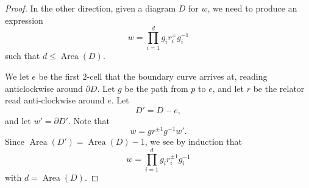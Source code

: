 \documentclass[a4paper]{article}
\DeclareMathOperator\Area{Area}
\begin{document}
\begin{proof}
%
%

  In the other direction, given a diagram $D$ for $w$, we need to produce an expression
  \[
    w = \prod_{i = 1}^d g_i r_i^{\pm} g_i^{-1}
  \]
  such that $d \leq \Area(D)$.

  We let $e$ be the first $2$-cell that the boundary curve arrives at, reading anticlockwise around $\partial D$. Let $g$ be the path from $p$ to $e$, and let $r$ be the relator read anti-clockwise around $e$. Let
  \[
    D' = D - e,
  \]
  and let $w' = \partial D'$. Note that
  \[
    w = gr^{\pm 1} g^{-1} w'.
  \]
  Since $\Area(D') = \Area(D) - 1$, we see by induction that
  \[
    w = \prod_{i = 1}^d g_i r_i^{\pm 1} g_i^{-1}
  \]
  with $d = \Area(D)$.
\end{proof}
\end{document}
